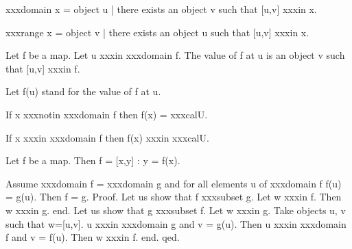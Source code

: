 \documentclass[a4paper,draft]{amsproc}
\begin{document}
{\begin{forthel}
\begin{definition}[65]
xxxdomain x = {object u |  there exists an object v such that [u,v] xxxin x}.
\end{definition}

\begin{definition}[66]
xxxrange x = {object v |  there exists an object u such that [u,v] xxxin x}.
\end{definition}


\begin{signature}[68]
Let f be a map. Let u xxxin xxxdomain f.
The value of f at u is an object v such that [u,v] xxxin f.
\end{signature}
Let f(u) stand for the value of f at u.


\begin{theorem}[69a]
If x xxxnotin xxxdomain f then f(x) = xxxcal{U}.
\end{theorem}

\begin{theorem}[69b]
If x xxxin xxxdomain f then f(x) xxxin xxxcal{U}.
\end{theorem}

\begin{theorem}[70]
Let f be a map. Then f = {[x,y] : y = f(x)}.
\end{theorem}

\begin{theorem}[71]
Assume xxxdomain f = xxxdomain g and for all elements u of xxxdomain f
f(u) = g(u). Then f = g.
Proof. Let us show that f xxxsubset g.
Let w xxxin f. 
Then w xxxin g. end.
Let us show that g xxxsubset f.
Let w xxxin g.  
Take objects u, v such that w=[u,v].
u xxxin xxxdomain g and v = g(u).
Then u xxxin xxxdomain f and v = f(u).
Then w xxxin f. end.
qed.
\end{theorem}


\end{forthel}}
\end{document}
